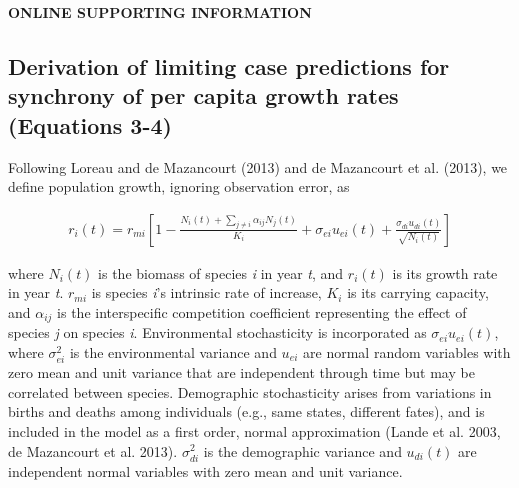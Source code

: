\documentclass[12pt,]{article}
\title{}
\author{}
\date{}
\begin{document}
\maketitle


\begin{center} 
\textbf{ONLINE SUPPORTING INFORMATION}
\end{center}

\renewcommand{\theequation}{S\arabic{equation}}
\renewcommand{\thetable}{S\arabic{table}}
\renewcommand{\thefigure}{S\arabic{figure}}

\tableofcontents
\listoffigures
\listoftables
\newpage{}

\subsection{Derivation of limiting case predictions for synchrony of per
capita growth rates (Equations
3-4)}\label{derivation-of-limiting-case-predictions-for-synchrony-of-per-capita-growth-rates-equations-3-4}

Following Loreau and {{de Mazancourt}} (2013) and {{de Mazancourt}} et
al. (2013), we define population growth, ignoring observation error, as

\begin{align}
r_i(t) = r_{mi} \left[ 1- \frac{N_i(t)+\sum_{j \neq i} \alpha_{ij}N_j(t)} {K_i} + \sigma_{ei}u_{ei}(t) + \frac{\sigma_{di}u_{di}(t)}{\sqrt{N_i(t)}} \right]
\end{align}

\noindent where \(N_i(t)\) is the biomass of species \emph{i} in year
\emph{t}, and \(r_i(t)\) is its growth rate in year \emph{t}. \(r_{mi}\)
is species \emph{i}'s intrinsic rate of increase, \(K_i\) is its
carrying capacity, and \(\alpha_{ij}\) is the interspecific competition
coefficient representing the effect of species \emph{j} on species
\emph{i}. Environmental stochasticity is incorporated as
\(\sigma_{ei}u_{ei}(t)\), where \(\sigma_{ei}^2\) is the environmental
variance and \(u_{ei}\) are normal random variables with zero mean and
unit variance that are independent through time but may be correlated
between species. Demographic stochasticity arises from variations in
births and deaths among individuals (e.g., same states, different
fates), and is included in the model as a first order, normal
approximation (Lande et al. 2003, {{de Mazancourt}} et al. 2013).
\(\sigma_{di}^2\) is the demographic variance and \(u_{di}(t)\) are
independent normal variables with zero mean and unit variance.
\end{document}
